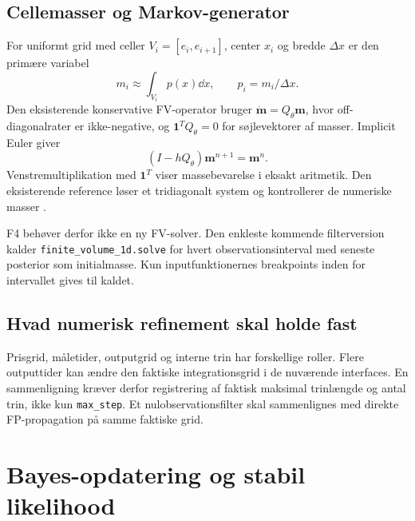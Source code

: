 \subsection{Cellemasser og Markov-generator}
For uniformt grid med celler \(V_i=[e_i,e_{i+1}]\), center \(x_i\) og bredde \(\Delta x\) er den primære variabel
\begin{equation}
 m_i\approx\int_{V_i}p(x)\dd x,\qquad p_i=m_i/\Delta x.
 \label{eq:mass}
\end{equation}
Den eksisterende konservative FV-operator bruger \(\dot{\bm m}=Q_\theta\bm m\), hvor off-diagonalrater er ikke-negative, og \(\bm1^TQ_\theta=0\) for søjlevektorer af masser. Implicit Euler giver
\begin{equation}
 (I-hQ_\theta)\bm m^{n+1}=\bm m^n.
 \label{eq:be}
\end{equation}
Venstremultiplikation med \(\bm1^T\) viser massebevarelse i eksakt aritmetik. Den eksisterende reference løser et tridiagonalt system og kontrollerer de numeriske masser \cite{repo}.

F4 behøver derfor ikke en ny FV-solver. Den enkleste kommende filterversion kalder \texttt{finite\_volume\_1d.solve} for hvert observationsinterval med seneste posterior som initialmasse. Kun inputfunktionernes breakpoints inden for intervallet gives til kaldet.

\subsection{Hvad numerisk refinement skal holde fast}
Prisgrid, måletider, outputgrid og interne trin har forskellige roller. Flere outputtider kan ændre den faktiske integrationsgrid i de nuværende interfaces. En sammenligning kræver derfor registrering af faktisk maksimal trinlængde og antal trin, ikke kun \texttt{max\_step}. Et nulobservationsfilter skal sammenlignes med direkte FP-propagation på samme faktiske grid.

\section{Bayes-opdatering og stabil likelihood}
